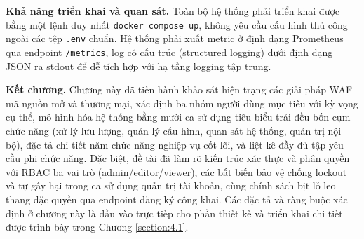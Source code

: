 \documentclass[../DoAn.tex]{subfiles}
\begin{document}
\textbf{Khả năng triển khai và quan sát.} Toàn bộ hệ thống phải triển khai
được bằng một lệnh duy nhất \texttt{docker compose up}, không yêu cầu cấu
hình thủ công ngoài các tệp \texttt{.env} chuẩn. Hệ thống phải xuất metric
ở định dạng Prometheus qua endpoint \texttt{/metrics}, log có cấu trúc
(structured logging) dưới định dạng JSON ra stdout để dễ tích hợp với hạ
tầng logging tập trung.

\bigskip
\noindent\textbf{Kết chương.}
Chương này đã tiến hành khảo sát hiện trạng các giải pháp WAF mã nguồn mở và
thương mại, xác định ba nhóm người dùng mục tiêu với kỳ vọng cụ thể, mô hình
hóa hệ thống bằng mười ca sử dụng tiêu biểu trải đều bốn cụm chức năng (xử
lý lưu lượng, quản lý cấu hình, quan sát hệ thống, quản trị nội bộ), đặc tả
chi tiết năm chức năng nghiệp vụ cốt lõi, và liệt kê đầy đủ tập yêu cầu phi
chức năng. Đặc biệt, đề tài đã làm rõ kiến trúc xác thực và phân quyền với
RBAC ba vai trò (admin/editor/viewer), các bất biến bảo vệ chống lockout và
tự gây hại trong ca sử dụng quản trị tài khoản, cùng chính sách bịt lỗ leo
thang đặc quyền qua endpoint đăng ký công khai. Các đặc tả và ràng buộc xác
định ở chương này là đầu vào trực tiếp cho phần thiết kế và triển khai chi
tiết được trình bày trong Chương \ref{section:4.1}.
\end{document}
